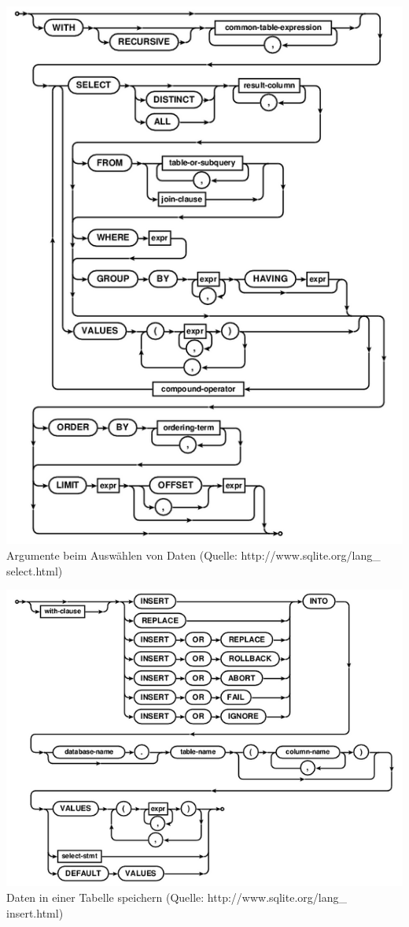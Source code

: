 \documentclass[12pt,a4paper]{report}
\begin{document}
\begin{onehalfspace}
\begin{center}
\includegraphics[scale=0.8]{img/sqlite_select.png}\\
Argumente beim Auswählen von Daten (Quelle: http://www.sqlite.org/lang\_ select.html)
\end{center}

\begin{center}
\includegraphics[scale=0.8]{img/sqlite_insert.png}\\
Daten in einer Tabelle speichern (Quelle: http://www.sqlite.org/lang\_ insert.html)
\end{center}


\end{onehalfspace}
\end{document}
